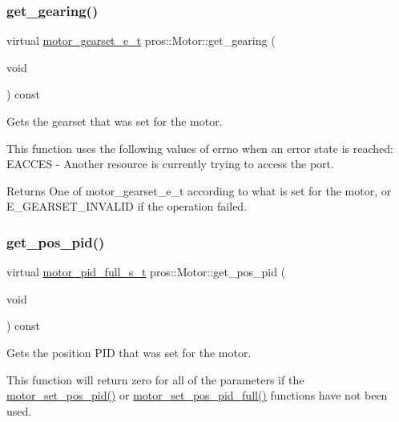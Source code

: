\subsubsection{\texorpdfstring{get\_gearing()}{get\_gearing()}}
{\footnotesize\ttfamily virtual \mbox{\hyperlink{motors_8h_aa2f1c305c998abc3bf8dd1f76fa4da8b}{motor\+\_\+gearset\+\_\+e\+\_\+t}} pros\+::\+Motor\+::get\+\_\+gearing (\begin{DoxyParamCaption}\item[{void}]{ }\end{DoxyParamCaption}) const\hspace{0.3cm}{\ttfamily [virtual]}}



Gets the gearset that was set for the motor. 

This function uses the following values of errno when an error state is reached\+: E\+A\+C\+C\+ES -\/ Another resource is currently trying to access the port.

\begin{DoxyReturn}{Returns}
One of motor\+\_\+gearset\+\_\+e\+\_\+t according to what is set for the motor, or E\+\_\+\+G\+E\+A\+R\+S\+E\+T\+\_\+\+I\+N\+V\+A\+L\+ID if the operation failed. 
\end{DoxyReturn}
\mbox{\label{classpros_1_1Motor_a32193b8d020ad1b47e1cb9f0b74a6c7d}} 
\subsubsection{\texorpdfstring{get\_pos\_pid()}{get\_pos\_pid()}}
{\footnotesize\ttfamily virtual \mbox{\hyperlink{motors_8h_a0295cbf49f5c70c17b5fa962bd25febd}{motor\+\_\+pid\+\_\+full\+\_\+s\+\_\+t}} pros\+::\+Motor\+::get\+\_\+pos\+\_\+pid (\begin{DoxyParamCaption}\item[{void}]{ }\end{DoxyParamCaption}) const\hspace{0.3cm}{\ttfamily [virtual]}}



Gets the position P\+ID that was set for the motor. 

This function will return zero for all of the parameters if the \mbox{\hyperlink{motors_8h_a389e60d01741d5947a9b7330c6c8bbf7}{motor\+\_\+set\+\_\+pos\+\_\+pid()}} or \mbox{\hyperlink{motors_8h_a1d3273573e296507914d2626121f19ce}{motor\+\_\+set\+\_\+pos\+\_\+pid\+\_\+full()}} functions have not been used.

